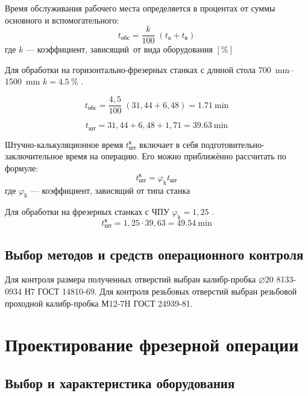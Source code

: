 \documentclass[14pt,russian,a4paper]{extreport}
\begin{document}
Время обслуживания рабочего места определяется в процентах от суммы основного и вспомогательного: 
\begin{equation}
  t_\text{обс} = \frac{k}{100} \; (t_\text{о} + t_\text{в})
\end{equation}
где $k$ --- коэффициент, зависящий от вида оборудования $[\%]$

Для обработки на горизонтально-фрезерных станках с длиной стола \SIrange{700}{1500}{\milli\meter} $ k = \SI{4,5}{\percent} $ \cite[прил.~5]{malzen:normirovanie}.

\begin{equation*}
  t_\text{обс} = \frac{4,5}{100} \; (31,44 + 6,48) = \SI{1,71}{\minute}
\end{equation*}

\begin{equation*}
  t_\text{шт} = 31,44 + 6,48 + 1,71 = \SI{39,63}{\minute}
\end{equation*}

Штучно-калькуляционное время $t_\text{шт}^\text{к}$ включает в себя подготовительно-заключительное время на операцию. Его можно приближённо рассчитать по формуле: 
\begin{equation}
  t_\text{шт}^\text{к} = \varphi_\text{k} t_\text{шт}
\end{equation}
где $\varphi_\text{k}$ --- коэффициент, зависящий от типа станка

Для обработки на фрезерных станках с ЧПУ $ \varphi_\text{k} = 1,25 $ \cite[прил.~7]{malzen:normirovanie}.
\begin{equation*}
  t_\text{шт}^\text{к} = 1,25 \cdot 39,63 = \SI{49,54}{\minute}
\end{equation*}


\subsection{Выбор методов и средств операционного контроля}

Для контроля размера полученных отверстий выбран калибр-пробка $\diameter 20$ 8133-0934 Н7 ГОСТ 14810-69. Для контроля резьбовых отверстий выбран резьбовой проходной калибр-пробка М12-7H ГОСТ 24939-81.

\section{Проектирование фрезерной операции}

\subsection{Выбор и характеристика оборудования}
\end{document}
